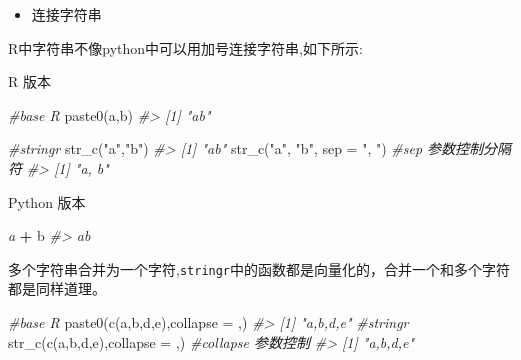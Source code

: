 \documentclass[
]{book}
\newenvironment{Shaded}{\begin{snugshade}}{\end{snugshade}}
\newcommand{\AttributeTok}[1]{\textcolor[rgb]{0.77,0.63,0.00}{#1}}
\newcommand{\CommentTok}[1]{\textcolor[rgb]{0.56,0.35,0.01}{\textit{#1}}}
\newcommand{\FunctionTok}[1]{\textcolor[rgb]{0.00,0.00,0.00}{#1}}
\newcommand{\NormalTok}[1]{#1}
\newcommand{\OperatorTok}[1]{\textcolor[rgb]{0.81,0.36,0.00}{\textbf{#1}}}
\newcommand{\StringTok}[1]{\textcolor[rgb]{0.31,0.60,0.02}{#1}}
\providecommand{\tightlist}{%
  \setlength{\itemsep}{0pt}\setlength{\parskip}{0pt}}
\begin{document}
\begin{itemize}
\tightlist
\item
  连接字符串
\end{itemize}

R中字符串不像python中可以用加号连接字符串,如下所示:

R 版本

\begin{Shaded}
\begin{Highlighting}[]
\CommentTok{\#base R}
\FunctionTok{paste0}\NormalTok{(}\StringTok{\textquotesingle{}a\textquotesingle{}}\NormalTok{,}\StringTok{\textquotesingle{}b\textquotesingle{}}\NormalTok{)}
\CommentTok{\#\textgreater{} [1] "ab"}

\CommentTok{\#stringr}
\FunctionTok{str\_c}\NormalTok{(}\StringTok{"a"}\NormalTok{,}\StringTok{"b"}\NormalTok{)}
\CommentTok{\#\textgreater{} [1] "ab"}
\FunctionTok{str\_c}\NormalTok{(}\StringTok{"a"}\NormalTok{, }\StringTok{"b"}\NormalTok{, }\AttributeTok{sep =} \StringTok{", "}\NormalTok{) }\CommentTok{\#sep 参数控制分隔符}
\CommentTok{\#\textgreater{} [1] "a, b"}
\end{Highlighting}
\end{Shaded}

Python 版本

\begin{Shaded}
\begin{Highlighting}[]
\CommentTok{\textquotesingle{}a\textquotesingle{}} \OperatorTok{+} \StringTok{\textquotesingle{}b\textquotesingle{}}
\CommentTok{\#\textgreater{} \textquotesingle{}ab\textquotesingle{}}
\end{Highlighting}
\end{Shaded}

多个字符串合并为一个字符,\texttt{stringr}中的函数都是向量化的，合并一个和多个字符都是同样道理。

\begin{Shaded}
\begin{Highlighting}[]
\CommentTok{\#base R}
\FunctionTok{paste0}\NormalTok{(}\FunctionTok{c}\NormalTok{(}\StringTok{\textquotesingle{}a\textquotesingle{}}\NormalTok{,}\StringTok{\textquotesingle{}b\textquotesingle{}}\NormalTok{,}\StringTok{\textquotesingle{}d\textquotesingle{}}\NormalTok{,}\StringTok{\textquotesingle{}e\textquotesingle{}}\NormalTok{),}\AttributeTok{collapse =} \StringTok{\textquotesingle{},\textquotesingle{}}\NormalTok{)}
\CommentTok{\#\textgreater{} [1] "a,b,d,e"}
\CommentTok{\#stringr}
\FunctionTok{str\_c}\NormalTok{(}\FunctionTok{c}\NormalTok{(}\StringTok{\textquotesingle{}a\textquotesingle{}}\NormalTok{,}\StringTok{\textquotesingle{}b\textquotesingle{}}\NormalTok{,}\StringTok{\textquotesingle{}d\textquotesingle{}}\NormalTok{,}\StringTok{\textquotesingle{}e\textquotesingle{}}\NormalTok{),}\AttributeTok{collapse =} \StringTok{\textquotesingle{},\textquotesingle{}}\NormalTok{)  }\CommentTok{\#collapse 参数控制}
\CommentTok{\#\textgreater{} [1] "a,b,d,e"}
\end{Highlighting}
\end{Shaded}
\end{document}
